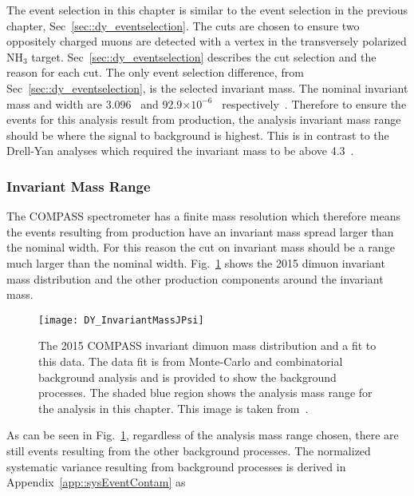 The event selection in this chapter is similar to the event selection in the
previous chapter, Sec~\ref{sec::dy_eventselection}.  The cuts are chosen to
ensure two oppositely charged muons are detected with a vertex in the
transversely polarized NH$_3$ target.  Sec~\ref{sec::dy_eventselection}
describes the cut selection and the reason for each cut.  The only event
selection difference, from Sec~\ref{sec::dy_eventselection}, is the selected
invariant mass.  The nominal {\jp} invariant mass and width are 3.096~{\gvcw}
and 92.9$\times10^{-6}$~{\gvcw} respectively~\cite{Tanabashi:2018oca}.
Therefore to ensure the events for this analysis result from {\jp} production,
the analysis invariant mass range should be where the {\jp} signal to background
is highest.  This is in contrast to the Drell-Yan analyses which required the
invariant mass to be above 4.3~{\gvcw}.

\subsubsection{{\jp} Invariant Mass Range}\label{sec::jpMassRange}
The COMPASS spectrometer has a finite mass resolution which therefore means the
events resulting from {\jp} production have an invariant mass spread larger than
the nominal {\jp} width.  For this reason the cut on invariant mass should be a
range much larger than the nominal {\jp} width.
Fig.~\ref{fig::DY_InvariantMassJPsi} shows the 2015 dimuon invariant mass
distribution and the other production components around the {\jp} invariant
mass.

\begin{figure}[h!t]
  \centering \texttt{[image: DY\_InvariantMassJPsi]}
  \caption{The 2015 COMPASS invariant dimuon mass distribution and a fit to this
    data.  The data fit is from Monte-Carlo and combinatorial background
    analysis and is provided to show the background processes.  The shaded blue
    region shows the analysis mass range for the analysis in this chapter.  This
    image is taken from~\cite{compassDYpaper}.}
  \label{fig::DY_InvariantMassJPsi}
\end{figure}

As can be seen in Fig.~\ref{fig::DY_InvariantMassJPsi}, regardless of the
analysis mass range chosen, there are still events resulting from the other
background processes.  The normalized systematic variance resulting from
background processes is derived in Appendix~\ref{app::sysEventContam} as

